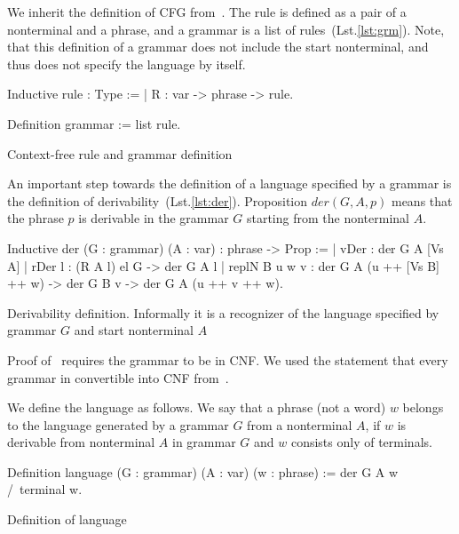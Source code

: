 We inherit the definition of CFG from~\cite{smolkaHofmann2016}. The rule is defined as a pair of a nonterminal and a phrase, and a grammar is a list of rules~(Lst.\ref{lst:grm}).
Note, that this definition of a grammar does not include the start nonterminal, and thus does not specify the language by itself.

\begin{listing}[h]
    \begin{pyglist}[language=coq, numbers=none, numbersep=5pt]
  Inductive rule : Type :=
  | R : var -> phrase -> rule.
        
  Definition grammar := list rule.
    \end{pyglist}
    \caption{Context-free rule and grammar definition}
    \label{lst:grm}
\end{listing}

An important step towards the definition of a language specified by a grammar is the definition of derivability~(Lst.\ref{lst:der}). Proposition $der(G, A, p)$ means that the phrase $p$ is derivable in the grammar $G$ starting from the nonterminal $A$.

\begin{listing}[h]
    \begin{pyglist}[language=coq, numbers=none, numbersep=5pt]
  Inductive der (G : grammar) 
                (A : var) : phrase -> Prop :=
  | vDer : der G A [Vs A]
  | rDer l : (R A l) el G -> der G A l
  | replN B u w v : 
      der G A (u ++ [Vs B] ++ w) -> 
      der G B v -> der G A (u ++ v ++ w).
    \end{pyglist}
    \caption{Derivability definition. Informally it is a recognizer of the language specified by grammar $G$ and start nonterminal $A$}
    \label{lst:der}
\end{listing}

Proof of~\cite{beigelproof} requires the grammar to be in CNF. We used the statement that every grammar in convertible into CNF from~\cite{smolkaHofmann2016}.

We define the language as follows. We say that a phrase (not a word) $ w $ belongs to the language generated by a grammar $G$ from a nonterminal $A$, if $ w $ is derivable from nonterminal $ A $ in grammar $ G $ and $ w $ consists only of terminals.

\begin{listing}[h]
	\begin{pyglist}[language=coq, numbers=none, numbersep=5pt]
  Definition language 
             (G : grammar)
			 (A : var)
			 (w : phrase) :=
    der G A w /\ terminal w.
	\end{pyglist}
	\caption{Definition of language}
	\label{lst:lang}
\end{listing}



